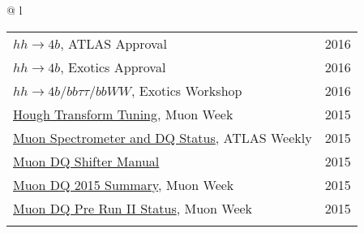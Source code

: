 \documentclass[letterpaper,11pt,oneside]{article}
\newcommand{\blue}[1]{\textcolor[rgb]{0,0,0.9}{#1}}
\begin{document}
\begin{flushleft}
\begin{tabular}{@{} l}
     \begin{tabular}{@{} l l }
     \blue{\href{https://indico.cern.ch/event/558982/contributions/2255258/attachments/1318349/}{$hh\to4b$}}, ATLAS Approval & 2016\\
     \blue{\href{https://indico.cern.ch/event/556566/contributions/2244051/attachments/1309161/}{$hh\to4b$}}, Exotics Approval & 2016\\
     \blue{\href{https://indico.cern.ch/event/465157/contributions/1972449/attachments/1255506}{$hh\to4b / bb\tau\tau / bbWW$}}, Exotics Workshop & 2016\\
     \blue{\href{https://indico.cern.ch/event/465396/contributions/1984207/attachments/1200912/}{Hough Transform Tuning}}, Muon Week & 2015\\
     \blue{\href{https://indico.cern.ch/event/444054/contributions/1099850/attachments/1154457}{Muon Spectrometer and DQ Status}}, ATLAS Weekly & 2015\\
     \blue{\href{https://twiki.cern.ch/twiki/pub/Atlas/MuonOfflineDQShiftInstructions/Muondq_instruction_tony_2015spring.pdf}{Muon DQ Shifter Manual}} & 2015\\
     \blue{\href{https://indico.cern.ch/event/464848/contributions/1983327/attachments/1202205}{Muon DQ 2015 Summary}}, Muon Week & 2015\\
     \blue{\href{https://indico.cern.ch/event/376175/contributions/893495/attachments/749756}{Muon DQ Pre Run II Status}}, Muon Week & 2015\\
     \hspace{0.7\linewidth} & \hspace{0.1\linewidth} \\
      \end{tabular}
      \end{tabular}
\end{flushleft}
\end{document}
